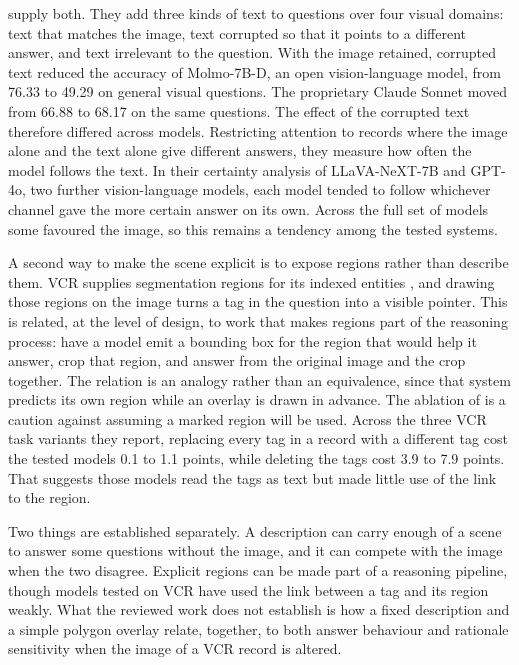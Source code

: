 \citet{DBLP:conf/cvpr/DengCCH25} supply both. They add three kinds of text to
questions over four visual domains: text that matches the image, text corrupted so
that it points to a different answer, and text irrelevant to the question. With
the image retained, corrupted text reduced the accuracy of Molmo-7B-D, an open
\mbox{vision-language} model, from 76.33 to 49.29 on general visual questions. The
proprietary Claude Sonnet moved from 66.88 to 68.17 on the same questions. The
effect of the corrupted text therefore differed across models. Restricting
attention to records where the image alone and the text alone give different
answers, they measure how often the model follows the text. In their certainty
analysis of LLaVA-NeXT-7B and GPT-4o, two further \mbox{vision-language} models,
each model tended to follow whichever channel gave the more certain answer on its
own. Across the full set of models some favoured the image, so this remains a
tendency among the tested systems.

A second way to make the scene explicit is to expose regions rather than describe
them. VCR supplies segmentation regions for its indexed entities
\citep{DBLP:conf/cvpr/ZellersBFC19}, and drawing those regions on the image turns a
tag in the question into a visible pointer. This is related, at the level of
design, to work that makes regions part of the reasoning process:
\citet{DBLP:journals/corr/abs-2403-16999} have a model emit a bounding box for the
region that would help it answer, crop that region, and answer from the original
image and the crop together. The relation is an analogy rather than an
equivalence, since that system predicts its own region while an overlay is drawn
in advance. The ablation of \citet{LiGWCNK24} is a caution against assuming a
marked region will be used. Across the three VCR task variants they report,
replacing every tag in a record with a different tag cost the tested models 0.1 to
1.1 points, while deleting the tags cost 3.9 to 7.9 points. That suggests those
models read the tags as text but made little use of the link to the region.

Two things are established separately. A description can carry enough of a scene
to answer some questions without the image, and it can compete with the image when
the two disagree. Explicit regions can be made part of a reasoning pipeline, though
models tested on VCR have used the link between a tag and its region weakly. What
the reviewed work does not establish is how a fixed description and a simple
polygon overlay relate, together, to both answer behaviour and rationale
sensitivity when the image of a VCR record is altered.

